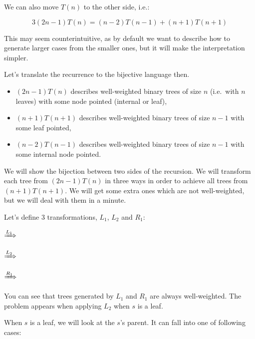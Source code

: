 \documentclass[final]{article}
\theoremstyle{definition}
\theoremstyle{definition}
\theoremstyle{remark}
\newcommand{\includeinlinesvg}[2]{\begin{minipage}{#1\textwidth}\end{minipage}}
\begin{document}
We can also move \(T(n)\) to the other side, i.e.:

\[3 (2 n - 1) T(n) = (n - 2) T(n - 1) + (n + 1) T(n + 1)\]

This may seem counterintuitive, as by default we want to describe how to generate larger cases from the smaller ones, but it will make the interpretation simpler.

Let's translate the recurrence to the bijective language then.
\begin{itemize}
    \item \((2 n - 1) T(n)\) describes well-weighted binary trees of size \(n\) (i.e.\ with \(n\) leaves) with some node pointed (internal or leaf),
    \item \((n + 1) T(n + 1)\) describes well-weighted binary trees of size \(n - 1\) with some leaf pointed,
    \item \((n - 2) T(n - 1)\) describes well-weighted binary trees of size \(n - 1\) with some internal node pointed.
\end{itemize}

We will show the bijection between two sides of the recursion. We will transform each tree from \((2 n - 1) T(n)\) in three ways in order to achieve all trees from \((n + 1) T(n + 1)\). We will get some extra ones which are not well-weighted, but we will deal with them in a minute.

Let's define 3 transformations, \(L_1\), \(L_2\) and \(R_1\):

\begin{center}
    \includeinlinesvg{.16}{schroder__lr_base}%
    \(\xRightarrow{L_1}\)%
    \includeinlinesvg{.16}{schroder__l1}%
    \hspace{.1\textwidth}%
    \includeinlinesvg{.16}{schroder__lr_base}%
    \(\xRightarrow{L_2}\)%
    \includeinlinesvg{.16}{schroder__l2}%

    \includeinlinesvg{.16}{schroder__lr_base}%
    \(\xRightarrow{R_1}\)%
    \includeinlinesvg{.16}{schroder__r1}%
\end{center}

You can see that trees generated by \(L_1\) and \(R_1\) are always well-weighted. The problem appears when applying \(L_2\) when \(s\) is a leaf.

When \(s\) is a leaf, we will look at the \(s\)'s parent. It can fall into one of following cases:
\end{document}
